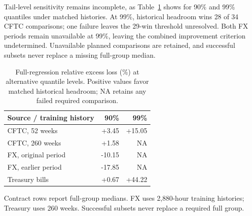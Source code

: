 Tail-level sensitivity remains incomplete, as Table~\ref{tab:v12-tau} shows for 90\% and 99\% quantiles under matched histories. At 99\%, historical headroom wins 28 of 34 CFTC comparisons; one failure leaves the 29-win threshold unresolved. Both FX periods remain unavailable at 99\%, leaving the combined improvement criterion undetermined. Unavailable planned comparisons are retained, and successful subsets never replace a missing full-group median.

\begin{table}[htbp]\centering\small
\caption{Full-regression relative excess loss (\%) at alternative quantile levels. Positive values favor matched historical headroom; NA retains any failed required comparison.}\label{tab:v12-tau}
\begin{tabular}{lrr}\toprule
Source / training history & 90\% & 99\% \\\midrule
CFTC, 52 weeks & +3.45 & +15.05 \\
CFTC, 260 weeks & +1.58 & \textsc{NA} \\
FX, original period & -10.15 & \textsc{NA} \\
FX, earlier period & -17.85 & \textsc{NA} \\
Treasury bills & +0.67 & +44.22 \\
\bottomrule\end{tabular}
\par\vspace{2pt}\begin{minipage}{.95\linewidth}\footnotesize
Contract rows report full-group medians. FX uses 2,880-hour training histories; Treasury uses 260 weeks. Successful subsets never replace a required full group.
\end{minipage}\end{table}
